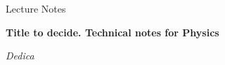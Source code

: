 \documentclass[12pt]{report}
\begin{document}
\begin{titlepage}

    \begin{center}
    {\LARGE Lecture Notes
    }
    \end{center}
    
    \begin{center}
    \vspace{1cm}
    {\huge\textbf{Title to decide. Technical notes for Physics} \par}
    \end{center}
    \par
      \vspace{2 cm}
    
            

\end{titlepage}
\null\thispagestyle{empty}\newpage %

\thispagestyle{empty}
\null{}
\begin{flushright}
\textit{Dedica}
\end{flushright}
\null
\null\thispagestyle{empty}\newpage %

\setcounter{tocdepth}{4}
\shipout\hbox{} %

\tableofcontents


\clearpage 








\printbibliography[
heading=bibintoc,
title={References}
]


\clearpage %
\end{document}
